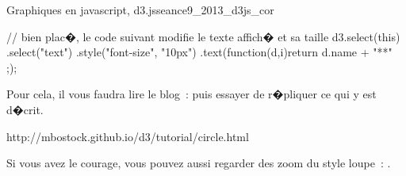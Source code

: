 \begin{xtd}{Graphiques en javascript, d3.js}{seance9_2013_d3js_cor}
\begin{verbatimx}
// bien plac�, le code suivant modifie le texte affich� et sa taille
d3.select(this)
	.select("text")
			.style("font-size", "10px")
			.text(function(d,i){return d.name + "**" ;});
\end{verbatimx}





Pour cela, il vous faudra lire le blog~:  puis essayer de r�pliquer ce qui y est d�crit.

http://mbostock.github.io/d3/tutorial/circle.html


\partietdEND

Si vous avez le courage, vous pouvez aussi regarder des zoom du style loupe~: .

\partietdCOMMENT



\end{xtd}




%
